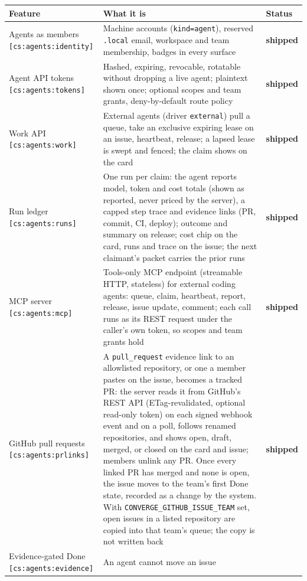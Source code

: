 \documentclass[11pt,a4paper]{report}
\newcommand{\cs}[1]{\,\texttt{\scriptsize[cs:#1]}\label{cs:#1}}
\newcommand{\csr}[1]{\,\texttt{\scriptsize[cs:#1]}}
\newcommand{\shipped}{\textbf{\textcolor{green!45!black}{shipped}}}
\begin{document}
\begin{center}
\begin{longtable}{@{}p{}p{}l@{}}
\toprule
\textbf{Feature} & \textbf{What it is} & \textbf{Status}\\
\midrule
\endhead
Agents as members\csr{agents:identity} & Machine accounts
  (\texttt{kind=agent}), reserved \texttt{.local} email, workspace and
  team membership, badges in every surface & \shipped\\
Agent API tokens\cs{agents:tokens} & Hashed, expiring, revocable,
  rotatable without dropping a live agent; plaintext shown once;
  optional scopes and team grants, deny-by-default route policy &
  \shipped\\
Work API\cs{agents:work} & External agents (driver
  \texttt{external}) pull a queue, take an exclusive expiring lease on an
  issue, heartbeat, release; a lapsed lease is swept and fenced; the
  claim shows on the card & \shipped\\
Run ledger\cs{agents:runs} & One run per claim: the agent reports model,
  token and cost totals (shown as reported, never priced by the server),
  a capped step trace and evidence links (PR, commit, CI, deploy);
  outcome and summary on release; cost chip on the card, runs and trace
  on the issue; the next claimant's packet carries the prior runs &
  \shipped\\
MCP server\cs{agents:mcp} & Tools-only MCP endpoint (streamable HTTP,
  stateless) for external coding agents: queue, claim, heartbeat, report,
  release, issue update, comment; each call runs as its REST request under
  the caller's own token, so scopes and team grants hold & \shipped\\
GitHub pull requests\cs{agents:prlinks} & A \texttt{pull\_request}
  evidence link to an allowlisted repository, or one a member pastes on
  the issue, becomes a tracked PR: the server reads it from GitHub's REST
  API (ETag-revalidated, optional read-only token) on each signed
  webhook event and on a poll, follows renamed repositories, and shows
  open, draft, merged, or closed on the card and issue; members unlink
  any PR. Once every linked PR has merged and none is open, the issue
  moves to the team's first Done state, recorded as a change by the
  system. With \texttt{CONVERGE\_GITHUB\_ISSUE\_TEAM} set, open issues
  in a listed repository are copied into that team's queue; the copy is
  not written back & \shipped\\
Evidence-gated Done\cs{agents:evidence} & An agent cannot move an issue

\end{longtable}
\end{center}
\end{document}
